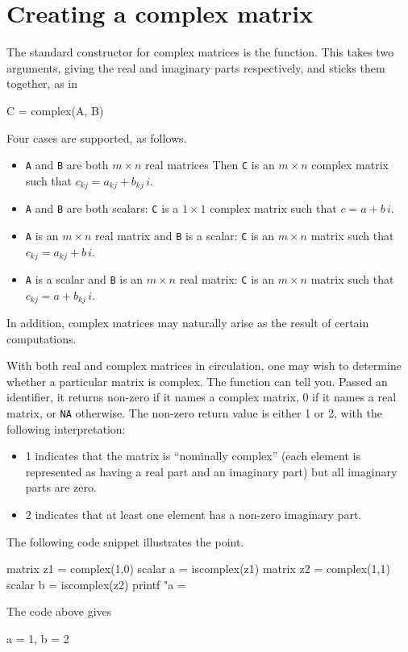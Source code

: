 \section{Creating a complex matrix}
\label{sec:cmplx-create}

The standard constructor for complex matrices is the 
function. This takes two arguments, giving the real and imaginary
parts respectively, and sticks them together, as in
\begin{code}
C = complex(A, B)
\end{code}
Four cases are supported, as follows.
\begin{itemize}
\item \texttt{A} and \texttt{B} are both $m \times n$ real matrices
  Then \texttt{C} is an $m \times n$ complex matrix such that
  $c_{kj} = a_{kj} + b_{kj}\,i$.
\item \texttt{A} and \texttt{B} are both scalars: \texttt{C} is a
  $1 \times 1$ complex matrix such that $c = a + b\,i$.
\item \texttt{A} is an $m \times n$ real matrix and \texttt{B} is a
  scalar: \texttt{C} is an $m \times n$ matrix such that
  $c_{kj} = a_{kj} + b\,i$.
\item \texttt{A} is a scalar and \texttt{B} is an $m \times n$ real
  matrix: \texttt{C} is an $m \times n$ matrix such that
  $c_{kj} = a + b_{kj}\,i$.
\end{itemize}

In addition, complex matrices may naturally arise as the result of
certain computations.

With both real and complex matrices in circulation, one may wish to
determine whether a particular matrix is complex. The function
 can tell you. Passed an identifier, it returns
non-zero if it names a complex matrix, 0 if it names a real matrix, or
\texttt{NA} otherwise. The non-zero return value is either 1 or 2,
with the following interpretation:
\begin{itemize}
\item 1 indicates that the matrix is ``nominally complex'' (each
  element is represented as having a real part and an imaginary part)
  but all imaginary parts are zero.
\item 2 indicates that at least one element has a non-zero imaginary
  part.
\end{itemize}
The following code snippet illustrates the point.
\begin{code}
matrix z1 = complex(1,0)
scalar a = iscomplex(z1)
matrix z2 = complex(1,1)
scalar b = iscomplex(z2)
printf "a = %
\end{code}
The code above gives
\begin{code}
a = 1, b = 2
\end{code}

